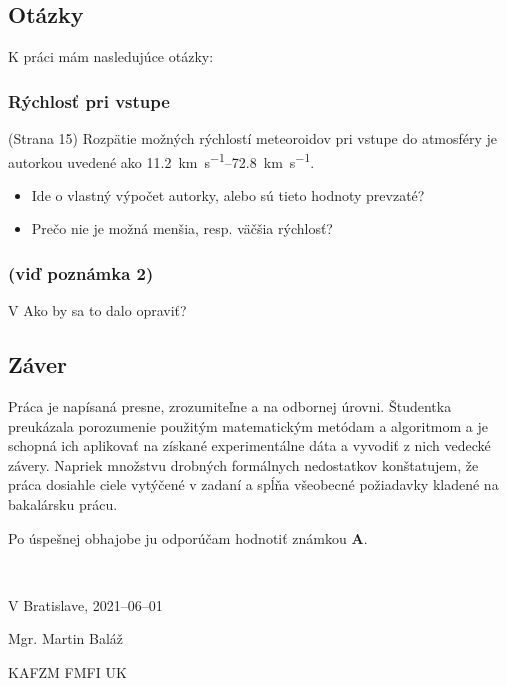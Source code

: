 \hypertarget{otuxe1zky}{%
\subsection{Otázky}\label{otuxe1zky}}

K práci mám nasledujúce otázky:

\hypertarget{ruxfdchlosux165-pri-vstupe}{%
\subsubsection{Rýchlosť pri vstupe}\label{ruxfdchlosux165-pri-vstupe}}

(Strana 15) Rozpätie možných rýchlostí meteoroidov pri vstupe do
atmosféry je autorkou uvedené ako
\SIrange{11.2}{72.8}{\kilo\metre\per\second}.

\begin{itemize}
\tightlist
\item
  Ide o vlastný výpočet autorky, alebo sú tieto hodnoty prevzaté?
\item
  Prečo nie je možná menšia, resp. väčšia rýchlosť?
\end{itemize}

\hypertarget{viux10f-poznuxe1mka-2}{%
\subsubsection{(viď poznámka 2)}\label{viux10f-poznuxe1mka-2}}

V Ako by sa to dalo opraviť?

\hypertarget{zuxe1ver}{%
\subsection{Záver}\label{zuxe1ver}}

Práca je napísaná presne, zrozumiteľne a na odbornej úrovni. Študentka
preukázala porozumenie použitým matematickým metódam a algoritmom a je
schopná ich aplikovať na získané experimentálne dáta a vyvodiť z nich
vedecké závery. Napriek množstvu drobných formálnych nedostatkov
konštatujem, že práca dosiahle ciele vytýčené v zadaní a spĺňa všeobecné
požiadavky kladené na bakalársku prácu.

Po úspešnej obhajobe ju odporúčam hodnotiť známkou \textbf{A}.

~

V Bratislave, 2021--06--01

\hfill Mgr. Martin Baláž

\hfill KAFZM FMFI UK
